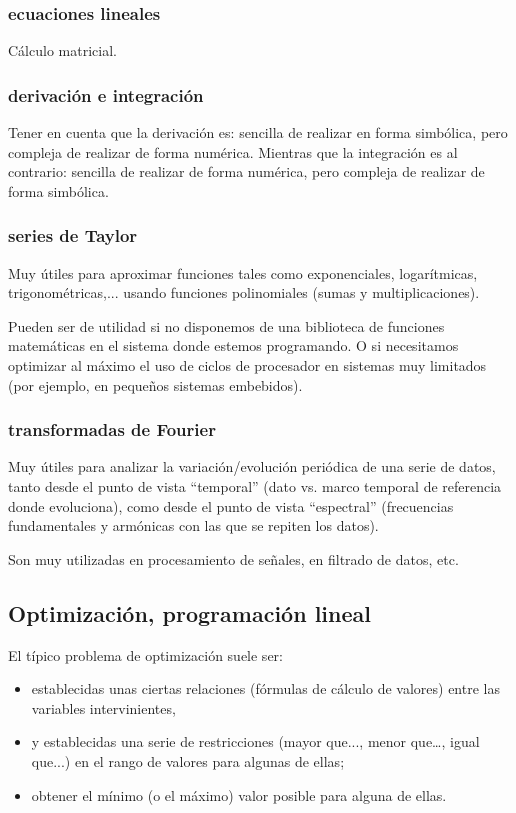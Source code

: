 \documentclass[spanish,12pt,a4paper,final,oneside]{book}
\begin{document}
\subsubsection{ecuaciones lineales}
Cálculo matricial.

\subsubsection{derivación e integración}
Tener en cuenta que la derivación es: sencilla de realizar en forma simbólica, pero compleja de realizar de forma numérica. Mientras que la integración es al contrario: sencilla de realizar de forma numérica, pero compleja de realizar de forma simbólica.

\subsubsection{series de Taylor}
Muy útiles para aproximar funciones tales como exponenciales, logarítmicas, trigonométricas,... usando funciones polinomiales (sumas y multiplicaciones).

Pueden ser de utilidad si no disponemos de una biblioteca de funciones matemáticas en el sistema donde estemos programando. O si necesitamos optimizar al máximo el uso de ciclos de procesador en sistemas muy limitados (por ejemplo, en pequeños sistemas embebidos).

\subsubsection{transformadas de Fourier}
Muy útiles para analizar la variación/evolución periódica de una serie de datos, tanto desde el punto de vista ``temporal'' (dato vs. marco temporal de referencia donde evoluciona), como desde el punto de vista ``espectral'' (frecuencias fundamentales y armónicas con las que se repiten los datos).

Son muy utilizadas en procesamiento de señales, en filtrado de datos, etc.

\subsection{Optimización, programación lineal}
El típico problema de optimización suele ser: 
\begin{itemize}
\item establecidas unas ciertas relaciones (fórmulas de cálculo de valores) entre las variables intervinientes, 
\item y establecidas una serie de restricciones (mayor que..., menor que…, igual que...) en el rango de valores para algunas de ellas; 
\item obtener el mínimo (o el máximo) valor posible para alguna de ellas.
\end{itemize}
\end{document}

